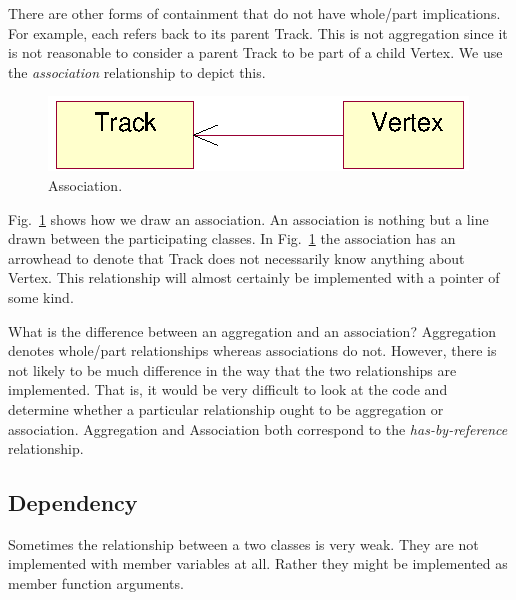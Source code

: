 \begin{Entry}
\begin{Entry}
\begin{Entry}
There are other forms of containment that do not have whole/part
implications. For example, each  refers back to its
parent Track. This is not aggregation since it is not reasonable to
consider a parent Track to be part of a child Vertex. We use the
\emph{association} relationship to depict this.

\begin{figure}[htb]
    \begin{center}
        \includegraphics{umlAssociation.eps}
        \caption{Association.}
        \label{fig:umlAssociation}
    \end{center}
\end{figure}

Fig.~\ref{fig:umlAssociation} shows how we draw an association.  An
association is nothing but a line drawn between the participating
classes. In Fig.~\ref{fig:umlAssociation} the association has an
arrowhead to denote that Track does not necessarily know anything
about Vertex. This relationship will almost certainly be implemented
with a pointer of some kind.

What is the difference between an aggregation and an association?
Aggregation denotes whole/part relationships whereas associations do
not. However, there is not likely to be much difference in the way
that the two relationships are implemented.  That is, it would be very
difficult to look at the code and determine whether a particular
relationship ought to be aggregation or association.  Aggregation and
Association both correspond to the \emph{has-by-reference}
relationship.

\subsection{Dependency}

Sometimes the relationship between a two classes is very weak. They
are not implemented with member variables at all. Rather they might be
implemented as member function arguments.


\end{Entry}
\end{Entry}
\end{Entry}
